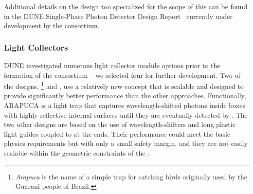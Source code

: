 Additional details on the design too specialized for the scope of this  can be found in the DUNE Single-Phase Photon Detector Design Report~  
 currently under development by the consortium. 
 


\subsubsection{Light Collectors} 
\label{sssec:photoncollectors}

DUNE investigated numerous  light collector module options prior to the formation of the \single {} consortium -- we selected four for further development. 
Two of the designs, \footnote{\textit{Arapuca} is the name of a simple trap for catching birds originally used by the Guarani people of Brazil.} %
and , %
use a relatively new concept that is scalable and designed to provide  
significantly better performance than the other approaches. Functionally, ARAPUCA is a light trap that captures wavelength-shifted photons inside boxes with highly reflective internal surfaces until they are eventually detected by .  The two other designs are based on the use of wavelength-shifters and long plastic light guides coupled to  at the ends. Their performance could meet the basic physics requirements but with only a small safety margin, and they are not easily scalable within the geometric constraints of the . 

